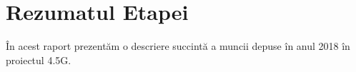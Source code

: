 \chapter{Rezumatul Etapei}

În acest raport prezentăm o descriere succintă a muncii depuse în anul 2018 în
proiectul 4.5G. 



